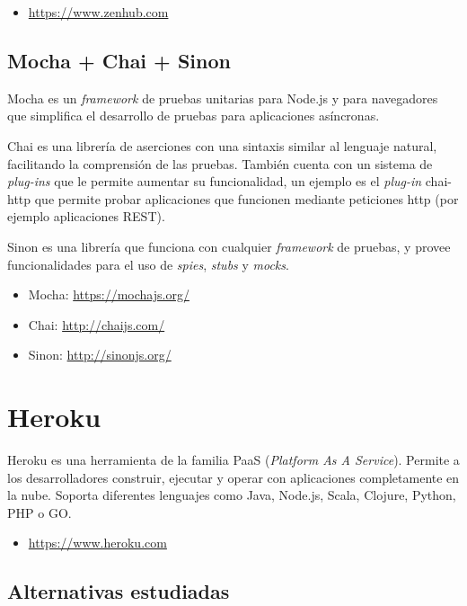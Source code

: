 \begin{itemize}
	\item \url{https://www.zenhub.com}
\end{itemize}

\subsection{Mocha + Chai + Sinon}

Mocha es un \textit{framework} de pruebas unitarias para Node.js y para navegadores que simplifica el desarrollo de pruebas para aplicaciones asíncronas.

Chai es una librería de aserciones con una sintaxis similar al lenguaje natural, facilitando la comprensión de las pruebas. También cuenta con un sistema de \textit{plug-ins} que le permite aumentar su funcionalidad, un ejemplo es el \textit{plug-in} chai-http que permite probar aplicaciones que funcionen mediante peticiones http (por ejemplo aplicaciones REST).

Sinon es una librería que funciona con cualquier \textit{framework} de pruebas, y provee funcionalidades para el uso de \textit{spies}, \textit{stubs} y \textit{mocks}. 

\begin{itemize}
	\item Mocha: \url{https://mochajs.org/}
	\item Chai: \url{http://chaijs.com/}
	\item Sinon: \url{http://sinonjs.org/}
\end{itemize}

\section{Heroku}

Heroku es una herramienta de la familia PaaS (\textit{Platform As A Service}). Permite a los desarrolladores construir, ejecutar y operar con aplicaciones completamente en la nube. Soporta diferentes lenguajes como Java, Node.js, Scala, Clojure, Python, PHP o GO.

\begin{itemize}
	\item \url{https://www.heroku.com}
\end{itemize}

\subsection{Alternativas estudiadas}

